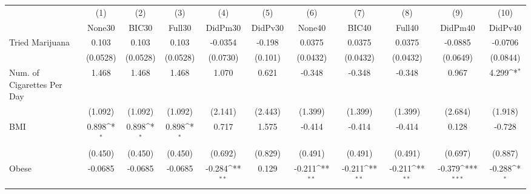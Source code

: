 {
\def\sym#1{\ifmmode^{#1}\else\(^{#1}\)\fi}
\begin{tabular}{l*{10}{c}}
\toprule
            &\multicolumn{1}{c}{(1)}&\multicolumn{1}{c}{(2)}&\multicolumn{1}{c}{(3)}&\multicolumn{1}{c}{(4)}&\multicolumn{1}{c}{(5)}&\multicolumn{1}{c}{(6)}&\multicolumn{1}{c}{(7)}&\multicolumn{1}{c}{(8)}&\multicolumn{1}{c}{(9)}&\multicolumn{1}{c}{(10)}\\
            &\multicolumn{1}{c}{None30}&\multicolumn{1}{c}{BIC30}&\multicolumn{1}{c}{Full30}&\multicolumn{1}{c}{DidPm30}&\multicolumn{1}{c}{DidPv30}&\multicolumn{1}{c}{None40}&\multicolumn{1}{c}{BIC40}&\multicolumn{1}{c}{Full40}&\multicolumn{1}{c}{DidPm40}&\multicolumn{1}{c}{DidPv40}\\
\midrule
Tried Marijuana&       0.103         &       0.103         &       0.103         &     -0.0354         &      -0.198         &      0.0375         &      0.0375         &      0.0375         &     -0.0885         &     -0.0706         \\
            &    (0.0528)         &    (0.0528)         &    (0.0528)         &    (0.0730)         &     (0.101)         &    (0.0432)         &    (0.0432)         &    (0.0432)         &    (0.0649)         &    (0.0844)         \\
\addlinespace
Num. of Cigarettes Per Day&       1.468         &       1.468         &       1.468         &       1.070         &       0.621         &      -0.348         &      -0.348         &      -0.348         &       0.967         &       4.299\sym{*}  \\
            &     (1.092)         &     (1.092)         &     (1.092)         &     (2.141)         &     (2.443)         &     (1.399)         &     (1.399)         &     (1.399)         &     (2.684)         &     (1.918)         \\
\addlinespace
BMI         &       0.898\sym{*}  &       0.898\sym{*}  &       0.898\sym{*}  &       0.717         &       1.575         &      -0.414         &      -0.414         &      -0.414         &       0.128         &      -0.728         \\
            &     (0.450)         &     (0.450)         &     (0.450)         &     (0.692)         &     (0.829)         &     (0.491)         &     (0.491)         &     (0.491)         &     (0.697)         &     (0.887)         \\
\addlinespace
Obese       &     -0.0685         &     -0.0685         &     -0.0685         &      -0.284\sym{**} &       0.129         &      -0.211\sym{**} &      -0.211\sym{**} &      -0.211\sym{**} &      -0.379\sym{***}&      -0.288\sym{*}  \\

\end{tabular}}
